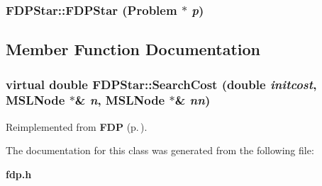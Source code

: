 \subsubsection{\setlength{\rightskip}{0pt plus 5cm}FDPStar::FDPStar ({\bf Problem} $\ast$ {\em p})}\label{class_FDPStar_a0}




\subsection{Member Function Documentation}
\subsubsection{\setlength{\rightskip}{0pt plus 5cm}virtual double FDPStar::Search\-Cost (double {\em initcost}, {\bf MSLNode} $\ast$\& {\em n}, {\bf MSLNode} $\ast$\& {\em nn})\hspace{0.3cm}{\tt  [protected, virtual]}}\label{class_FDPStar_b0}




Reimplemented from {\bf FDP} {\rm (p.\,\pageref{class_FDP_b0})}.

The documentation for this class was generated from the following file:\begin{CompactItemize}
\item 
{\bf fdp.h}\end{CompactItemize}
